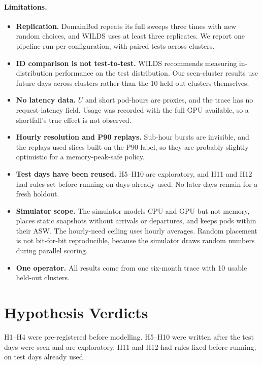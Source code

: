 \documentclass[10pt]{article}
\begin{document}
\paragraph{Limitations.}
\begin{itemize}
  \item \textbf{Replication.} DomainBed repeats its full sweeps three times with new random choices, and WILDS uses at least three replicates. We report one pipeline run per configuration, with paired tests across clusters.
  \item \textbf{ID comparison is not test-to-test.} WILDS recommends measuring in-distribution performance on the test distribution. Our seen-cluster results use future days across clusters rather than the 10 held-out clusters themselves.
  \item \textbf{No latency data.} $U$ and short pod-hours are proxies, and the trace has no request-latency field. Usage was recorded with the full GPU available, so a shortfall's true effect is not observed.
  \item \textbf{Hourly resolution and P90 replays.} Sub-hour bursts are invisible, and the replays used slices built on the P90 label, so they are probably slightly optimistic for a memory-peak-safe policy.
  \item \textbf{Test days have been reused.} H5--H10 are exploratory, and H11 and H12 had rules set before running on days already used. No later days remain for a fresh holdout.
  \item \textbf{Simulator scope.} The simulator models CPU and GPU but not memory, places static snapshots without arrivals or departures, and keeps pods within their ASW. The hourly-need ceiling uses hourly averages. Random placement is not bit-for-bit reproducible, because the simulator draws random numbers during parallel scoring.
  \item \textbf{One operator.} All results come from one six-month trace with 10 usable held-out clusters.
\end{itemize}




\appendix

\section{Hypothesis Verdicts}
\label{app:verdicts}

H1--H4 were pre-registered before modelling. H5--H10 were written after the test days were seen and are exploratory. H11 and H12 had rules fixed before running, on test days already used.
\end{document}
